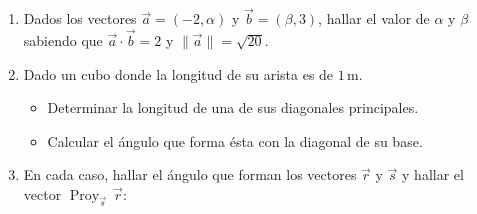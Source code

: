 \documentclass[11pt]{article}
\begin{document}
\begin{enumerate}[\hspace{-3mm}$1)$]








\item   Dados los vectores $\vec{a} = (-2, \alpha)$ y $\vec{b} = (\beta, 3)$, hallar el valor de $\alpha$ y $\beta$ sabiendo que $\vec{a} \cdot \vec{b} = 2$ y $\|\vec{a}\| = \sqrt{20}$.










\item Dado un cubo donde la longitud de su arista es de $1\,\text{m}$.

    \begin{itemize}
        \item[a)] Determinar la longitud de una de sus diagonales principales.
        \item[b)] Calcular el ángulo que forma ésta con la diagonal de su base.
    \end{itemize}









\item En cada caso, hallar el ángulo que forman los vectores $\vec{r}$ y $\vec{s}$ y hallar el vector $\operatorname{Proy}_{\vec{s}} \,\vec{r}$:

    \begin{enumerate}
    \end{enumerate}







\end{enumerate}
\end{document}
